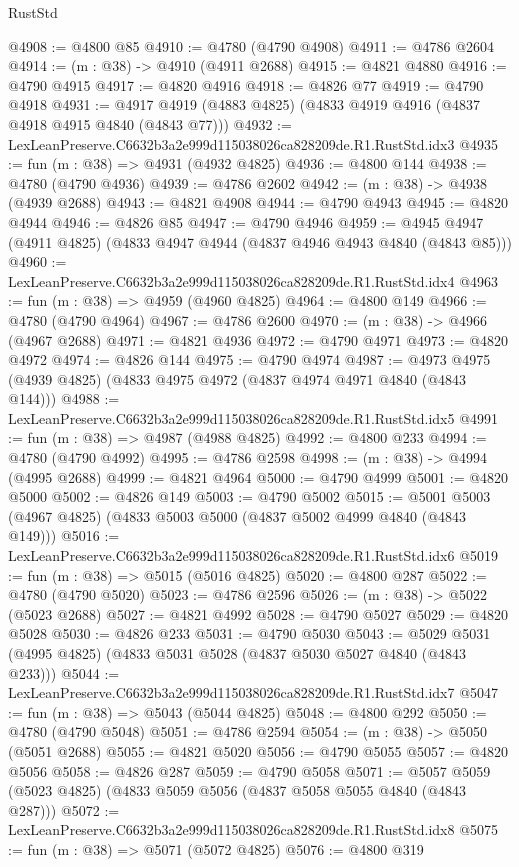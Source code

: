 \begin{lexlean}{RustStd}
\begin{coremodule}
@4908 := @4800 @85
@4910 := @4780 (@4790 @4908)
@4911 := @4786 @2604
@4914 := (m : @38) -> @4910 (@4911 @2688)
@4915 := @4821 @4880
@4916 := @4790 @4915
@4917 := @4820 @4916
@4918 := @4826 @77
@4919 := @4790 @4918
@4931 := @4917 @4919 (@4883 @4825) (@4833 @4919 @4916 (@4837 @4918 @4915 @4840 (@4843 @77)))
@4932 := LexLeanPreserve.C6632b3a2e999d115038026ca828209de.R1.RustStd.idx3
@4935 := fun (m : @38) => @4931 (@4932 @4825)
@4936 := @4800 @144
@4938 := @4780 (@4790 @4936)
@4939 := @4786 @2602
@4942 := (m : @38) -> @4938 (@4939 @2688)
@4943 := @4821 @4908
@4944 := @4790 @4943
@4945 := @4820 @4944
@4946 := @4826 @85
@4947 := @4790 @4946
@4959 := @4945 @4947 (@4911 @4825) (@4833 @4947 @4944 (@4837 @4946 @4943 @4840 (@4843 @85)))
@4960 := LexLeanPreserve.C6632b3a2e999d115038026ca828209de.R1.RustStd.idx4
@4963 := fun (m : @38) => @4959 (@4960 @4825)
@4964 := @4800 @149
@4966 := @4780 (@4790 @4964)
@4967 := @4786 @2600
@4970 := (m : @38) -> @4966 (@4967 @2688)
@4971 := @4821 @4936
@4972 := @4790 @4971
@4973 := @4820 @4972
@4974 := @4826 @144
@4975 := @4790 @4974
@4987 := @4973 @4975 (@4939 @4825) (@4833 @4975 @4972 (@4837 @4974 @4971 @4840 (@4843 @144)))
@4988 := LexLeanPreserve.C6632b3a2e999d115038026ca828209de.R1.RustStd.idx5
@4991 := fun (m : @38) => @4987 (@4988 @4825)
@4992 := @4800 @233
@4994 := @4780 (@4790 @4992)
@4995 := @4786 @2598
@4998 := (m : @38) -> @4994 (@4995 @2688)
@4999 := @4821 @4964
@5000 := @4790 @4999
@5001 := @4820 @5000
@5002 := @4826 @149
@5003 := @4790 @5002
@5015 := @5001 @5003 (@4967 @4825) (@4833 @5003 @5000 (@4837 @5002 @4999 @4840 (@4843 @149)))
@5016 := LexLeanPreserve.C6632b3a2e999d115038026ca828209de.R1.RustStd.idx6
@5019 := fun (m : @38) => @5015 (@5016 @4825)
@5020 := @4800 @287
@5022 := @4780 (@4790 @5020)
@5023 := @4786 @2596
@5026 := (m : @38) -> @5022 (@5023 @2688)
@5027 := @4821 @4992
@5028 := @4790 @5027
@5029 := @4820 @5028
@5030 := @4826 @233
@5031 := @4790 @5030
@5043 := @5029 @5031 (@4995 @4825) (@4833 @5031 @5028 (@4837 @5030 @5027 @4840 (@4843 @233)))
@5044 := LexLeanPreserve.C6632b3a2e999d115038026ca828209de.R1.RustStd.idx7
@5047 := fun (m : @38) => @5043 (@5044 @4825)
@5048 := @4800 @292
@5050 := @4780 (@4790 @5048)
@5051 := @4786 @2594
@5054 := (m : @38) -> @5050 (@5051 @2688)
@5055 := @4821 @5020
@5056 := @4790 @5055
@5057 := @4820 @5056
@5058 := @4826 @287
@5059 := @4790 @5058
@5071 := @5057 @5059 (@5023 @4825) (@4833 @5059 @5056 (@4837 @5058 @5055 @4840 (@4843 @287)))
@5072 := LexLeanPreserve.C6632b3a2e999d115038026ca828209de.R1.RustStd.idx8
@5075 := fun (m : @38) => @5071 (@5072 @4825)
@5076 := @4800 @319

\end{coremodule}
\end{lexlean}
